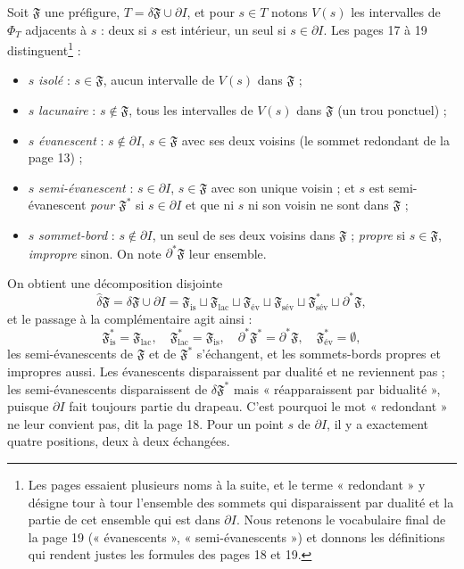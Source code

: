 \documentclass[11pt,a4paper]{article}
\begin{document}
Soit $\mathfrak{F}$ une préfigure, $T = \delta\mathfrak{F} \cup \partial I$, et
pour $s \in T$ notons $V(s)$ les intervalles de $\Phi_{T}$ adjacents à $s$ :
deux si $s$ est intérieur, un seul si $s \in \partial I$. Les pages 17 à 19
distinguent\footnote{Les pages essaient plusieurs noms à la suite, et le terme
« redondant » y désigne tour à tour l'ensemble des sommets qui disparaissent
par dualité et la partie de cet ensemble qui est dans $\partial I$. Nous
retenons le vocabulaire final de la page 19 (« évanescents », « semi-évanescents »)
et donnons les définitions qui rendent justes les formules des pages 18 et 19.} :
\begin{itemize}
\item $s$ \emph{isolé} : $s \in \mathfrak{F}$, aucun intervalle de $V(s)$ dans
$\mathfrak{F}$ ;
\item $s$ \emph{lacunaire} : $s \notin \mathfrak{F}$, tous les intervalles de
$V(s)$ dans $\mathfrak{F}$ (un trou ponctuel) ;
\item $s$ \emph{évanescent} : $s \notin \partial I$, $s \in \mathfrak{F}$ avec
ses deux voisins (le sommet redondant de la page 13) ;
\item $s$ \emph{semi-évanescent} : $s \in \partial I$, $s \in \mathfrak{F}$ avec
son unique voisin ; et $s$ est semi-évanescent \emph{pour $\mathfrak{F}^{*}$}
si $s \in \partial I$ et que ni $s$ ni son voisin ne sont dans $\mathfrak{F}$ ;
\item $s$ \emph{sommet-bord} : $s \notin \partial I$, un seul de ses deux
voisins dans $\mathfrak{F}$ ; \emph{propre} si $s \in \mathfrak{F}$, \emph{impropre}
sinon. On note $\partial^{*}\mathfrak{F}$ leur ensemble.
\end{itemize}
On obtient une décomposition disjointe
\[
\widehat{\delta}\mathfrak{F} = \delta\mathfrak{F} \cup \partial I =
\mathfrak{F}_{\mathrm{is}} \sqcup \mathfrak{F}_{\mathrm{lac}} \sqcup
\mathfrak{F}_{\text{év}} \sqcup \mathfrak{F}_{\text{sév}}
\sqcup \mathfrak{F}^{*}_{\text{sév}} \sqcup \partial^{*}\mathfrak{F},
\]
et le passage à la complémentaire agit ainsi :
\[
\mathfrak{F}^{*}_{\mathrm{is}} = \mathfrak{F}_{\mathrm{lac}}, \quad
\mathfrak{F}^{*}_{\mathrm{lac}} = \mathfrak{F}_{\mathrm{is}}, \quad
\partial^{*}\mathfrak{F}^{*} = \partial^{*}\mathfrak{F}, \quad
\mathfrak{F}^{*}_{\text{év}} = \emptyset ,
\]
les semi-évanescents de $\mathfrak{F}$ et de $\mathfrak{F}^{*}$ s'échangent, et
les sommets-bords propres et impropres aussi. Les évanescents disparaissent par
dualité et ne reviennent pas ; les semi-évanescents disparaissent de
$\delta\mathfrak{F}^{*}$ mais « réapparaissent par bidualité », puisque
$\partial I$ fait toujours partie du drapeau. C'est pourquoi le mot
« redondant » ne leur convient pas, dit la page 18. Pour un point $s$ de
$\partial I$, il y a exactement quatre positions, deux à deux échangées.
\end{document}
